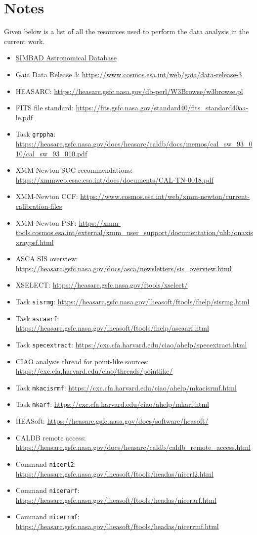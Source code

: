 \section*{Notes}
	Given below is a list of all the resources used to perform the data analysis in the current work.
	\begin{itemize}
		\item \href{http://simbad.u-strasbg.fr/simbad/}{SIMBAD Astronomical Database}
		\item Gaia Data Release 3: \url{https://www.cosmos.esa.int/web/gaia/data-release-3}
		\item HEASARC: \url{https://heasarc.gsfc.nasa.gov/db-perl/W3Browse/w3browse.pl}
		\item FITS file standard: \url{https://fits.gsfc.nasa.gov/standard40/fits_standard40aa-le.pdf}
		\item Task \texttt{grppha}: \url{https://heasarc.gsfc.nasa.gov/docs/heasarc/caldb/docs/memos/cal_sw_93_010/cal_sw_93_010.pdf}
		\item XMM-Newton SOC recommendations: \url{https://xmmweb.esac.esa.int/docs/documents/CAL-TN-0018.pdf}
		\item XMM-Newton CCF: \url{https://www.cosmos.esa.int/web/xmm-newton/current-calibration-files}
		\item XMM-Newton PSF: \url{https://xmm-tools.cosmos.esa.int/external/xmm_user_support/documentation/uhb/onaxisxraypsf.html}
		\item ASCA SIS overview: \url{https://heasarc.gsfc.nasa.gov/docs/asca/newsletters/sis_overview.html}
		\item XSELECT: \url{https://heasarc.gsfc.nasa.gov/ftools/xselect/}
		\item Task \texttt{sisrmg}: \url{https://heasarc.gsfc.nasa.gov/lheasoft/ftools/fhelp/sisrmg.html}
		\item Task \texttt{ascaarf}: \url{https://heasarc.gsfc.nasa.gov/lheasoft/ftools/fhelp/ascaarf.html}
		\item Task \texttt{specextract}: \url{https://cxc.cfa.harvard.edu/ciao/ahelp/specextract.html}
		\item CIAO analysis thread for point-like sources: \url{https://cxc.cfa.harvard.edu/ciao/threads/pointlike/}
		\item Task \texttt{mkacisrmf}: \url{https://cxc.cfa.harvard.edu/ciao/ahelp/mkacisrmf.html}
		\item Task \texttt{mkarf}: \url{https://cxc.cfa.harvard.edu/ciao/ahelp/mkarf.html}
		\item HEASoft: \url{https://heasarc.gsfc.nasa.gov/docs/software/heasoft/}
		\item CALDB remote access: \url{https://heasarc.gsfc.nasa.gov/docs/heasarc/caldb/caldb_remote_access.html}
		\item Command \texttt{nicerl2}: \url{https://heasarc.gsfc.nasa.gov/lheasoft/ftools/headas/nicerl2.html}
		\item Command \texttt{nicerarf}: \url{https://heasarc.gsfc.nasa.gov/lheasoft/ftools/headas/nicerarf.html}
		\item Command \texttt{nicerrmf}: \url{https://heasarc.gsfc.nasa.gov/lheasoft/ftools/headas/nicerrmf.html}
	\end{itemize}